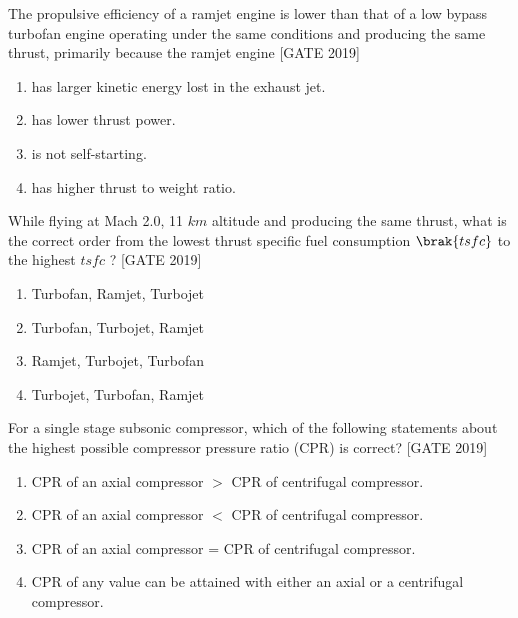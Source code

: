 \item The propulsive efficiency of a ramjet engine is lower than that of a low bypass turbofan engine operating under the same conditions and producing the same thrust, primarily because the ramjet engine
    \hfill{[GATE 2019]}
    \begin{multicols}{2}
        \begin{enumerate}
            \item has larger kinetic energy lost in the exhaust jet.
            \item has lower thrust power.
            \item is not self-starting.
            \item has higher thrust to weight ratio.
        \end{enumerate}
    \end{multicols}

\item While flying at Mach 2.0, 11  $km$   altitude and producing the same thrust, what is the correct order from the lowest thrust specific fuel consumption $\brak{tsfc}$ to the highest $ tsfc $ ?
    \hfill{[GATE 2019]}
    \begin{multicols}{2}
        \begin{enumerate}
            \item Turbofan, Ramjet, Turbojet
            \item Turbofan, Turbojet, Ramjet
            \item Ramjet, Turbojet, Turbofan
            \item Turbojet, Turbofan, Ramjet
        \end{enumerate}
    \end{multicols}

    \item For a single stage subsonic compressor, which of the following statements about the highest possible compressor pressure ratio (CPR) is correct?
    \hfill{[GATE 2019]}
   
        \begin{enumerate}
            \item CPR of an axial compressor $>$ CPR of centrifugal compressor.
            \item CPR of an axial compressor $<$ CPR of centrifugal compressor.
            \item CPR of an axial compressor = CPR of centrifugal compressor.
            \item CPR of any value can be attained with either an axial or a centrifugal compressor.
        \end{enumerate}
 


